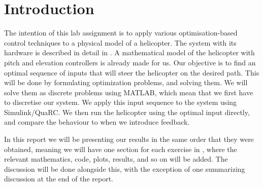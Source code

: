 \section{Introduction}

The intention of this lab assignment is to apply various optimisation-based control techniques to a physical model of a helicopter. The system with its hardware is described in detail in \cite{_helicopter_2015}. A mathematical model of the helicopter with pitch and elevation controllers is already made for us. Our objective is to find an optimal sequence of inputs that will steer the helicopter on the desired path. This will be done by formulating optimization problems, and solving them. We will solve them as discrete problems using MATLAB, which mean that we first have to discretise our system. We apply this input sequence to the system using Simulink/QuaRC. We then run the helicopter using the optimal input directly, and compare the behaviour to when we introduce feedback.

In this report we will be presenting our results in the same order that they were obtained, meaning we will have one section for each exercise in \cite{_helicopter_2015}, where the relevant mathematics, code, plots, results, and so on will be added. The discussion will be done alongside this, with the exception of one summarizing discussion at the end of the report. 